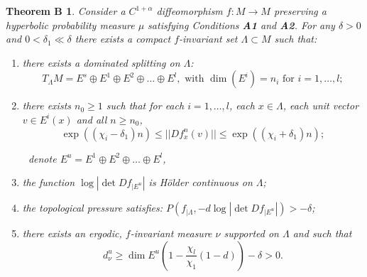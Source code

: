 \documentclass{amsart}
\theoremstyle{plain}
\newtheorem{thm}{Theorem}[section]
\newtheorem*{thmB}{Theorem B}
\theoremstyle{definition}
\theoremstyle{remark}
\numberwithin{equation}{section}
\begin{document}









\begin{thmB}\label{thm:Kat}
Consider a $C^{1+\alpha}$ diffeomorphism $f:M \to M$ preserving a hyperbolic probability measure $\mu$ satisfying Conditions \textbf{A1} and \textbf{A2}. For any $\delta>0$ and $0 <\delta_1  \ll \delta $ there exists a compact $f$-invariant set $\Lambda\subset M$ such that:
\begin{enumerate}
\item there exists a dominated splitting on $\Lambda$:
$$ T_{\Lambda}M = E^s \oplus E^1 \oplus E^2 \oplus \ldots \oplus E^l, \text{ with }\dim(E^i)=n_i \text{ for }i= 1,\ldots, l;   $$
\item there exists $n_0\geq 1$ such that for each $i= 1,\ldots, l$, each $x\in\Lambda$, each unit vector $v\in E^i(x)$ and all $n\geq n_0$,
$$   \exp((\chi_i -\delta_1)n)\leq ||   Df^n_x(v) ||  \leq   \exp((\chi_i+\delta_1)n) ;  $$

$~$
\newline denote  $E^u =  E^1 \oplus E^2 \oplus \ldots \oplus E^l$,

\item the function $   \log |  \det  Df_{| E^{u}}|  $ is H\"older continuous on $\Lambda$;

\item the topological pressure satisfies:  $P(f_{|\Lambda},   - d   \log |  \det  Df_{| E^u}| ) > -\delta $;

\item there exists an ergodic, $f$-invariant measure $\nu$ supported on $\Lambda$ and such that
$$ d^u_{\nu}  \geq  \dim E^u \left(       1 - \frac{\chi_l}{\chi_1}(1-d)  \right)   - \delta  >0 .    $$ 
\end{enumerate}
\end{thmB}
\end{document}
